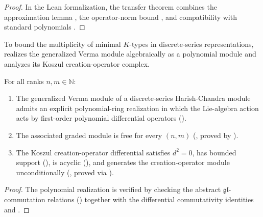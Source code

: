 \begin{proof}
In the Lean formalization, the transfer theorem
 combines the
approximation lemma
, the
operator-norm bound
, and
compatibility with standard polynomials
.
\end{proof}

To bound the multiplicity of minimal $K$-types in discrete-series
representations, 
realizes the generalized Verma module algebraically as a polynomial module and
analyzes its Koszul creation-operator complex.

\begin{theorem}
\label{thm:ch03-verma-koszul}
For all ranks $n, m \in \mathbb{N}$:
\begin{enumerate}
  \item The generalized Verma module of a discrete-series Harish-Chandra module
        admits an explicit polynomial-ring realization in which the Lie-algebra
        action acts by first-order polynomial differential operators
        ().
  \item The associated graded module is free for every $(n, m)$
        (, proved by
        ).
  \item The Koszul creation-operator differential satisfies $d^2 = 0$, has
        bounded support
        (), is
        acyclic (), and generates the
        creation-operator module unconditionally
        (, proved via
        ).
\end{enumerate}
\end{theorem}

\begin{proof}
The polynomial realization
 is verified
by checking the abstract $\mathfrak{gl}$-commutation relations
() together with
the differential commutativity identities
 and
.
\end{proof}

